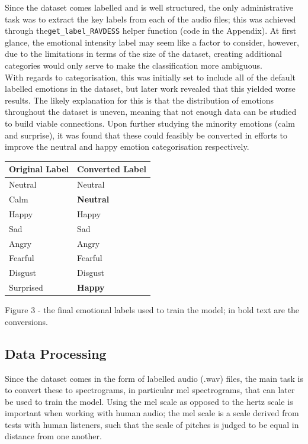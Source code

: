 \documentclass[12pt]{article}
\newcommand{\code}[1]{\colorbox{light-gray}{\texttt{#1}}}
\begin{document}
\noindent Since the dataset comes labelled and is well structured, the only administrative task was to extract the key labels from each of the audio files; this was achieved through the\code{get\_label\_RAVDESS} helper function (code in the Appendix). At first glance, the emotional intensity label may seem like a factor to consider, however, due to the limitations in terms of the size of the dataset, creating additional categories would only serve to make the classification more ambiguous.
\\

\noindent With regards to categorisation, this was initially set to include all of the default labelled emotions in the dataset, but later work revealed that this yielded worse results. The likely explanation for this is that the distribution of emotions throughout the dataset is uneven, meaning that not enough data can be studied to build viable connections. Upon further studying the minority emotions (calm and surprise), it was found that these could feasibly be converted in efforts to improve the neutral and happy emotion categorisation respectively. 
\\
\begin{center}
\begin{tabularx}{\textwidth}{ |X|X| }
\hline 
  \textbf{Original Label}  & \textbf{Converted Label} \\
  \hline
  Neutral & Neutral \\
  \hline
  Calm & \textbf{Neutral} \\
  \hline
  Happy & Happy \\
  \hline
  Sad & Sad \\
  \hline
  Angry & Angry \\
  \hline
  Fearful & Fearful \\
  \hline
  Disgust & Disgust \\
  \hline
  Surprised & \textbf{Happy} \\
  \hline
\end{tabularx}
\end{center}
Figure 3 - the final emotional labels used to train the model; in bold text are the conversions.
\\
\subsection{Data Processing}
Since the dataset comes in the form of labelled audio (.wav) files, the main task is to convert these to spectrograms, in particular mel spectrograms, that can later be used to train the model. Using the mel scale as opposed to the hertz scale is important when working with human audio; the mel scale is a scale derived from tests with human listeners, such that the scale of pitches is judged to be equal in distance from one another.
\\
\end{document}
